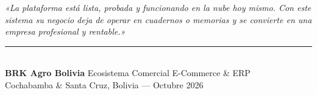 \documentclass[11pt,a4paper]{article}
\begin{document}
\begin{tcolorbox}[colback=white,colframe=AgroGreen!80!black,title=\textbf{Paso 5: Cierre de Negocio y Entrega Inmediata (Minuto 5)}]
\textit{«La plataforma está lista, probada y funcionando en la nube hoy mismo. Con este sistema su negocio deja de operar en cuadernos o memorias y se convierte en una empresa profesional y rentable.»}
\end{tcolorbox}

\vspace{0.8cm}
\begin{center}
\rule{0.6\linewidth}{0.6pt}\\[0.2cm]
\small\textbf{BRK Agro Bolivia} \textbar{} Ecosistema Comercial E-Commerce \& ERP\\
Cochabamba \& Santa Cruz, Bolivia --- Octubre 2026
\end{center}
\end{document}
